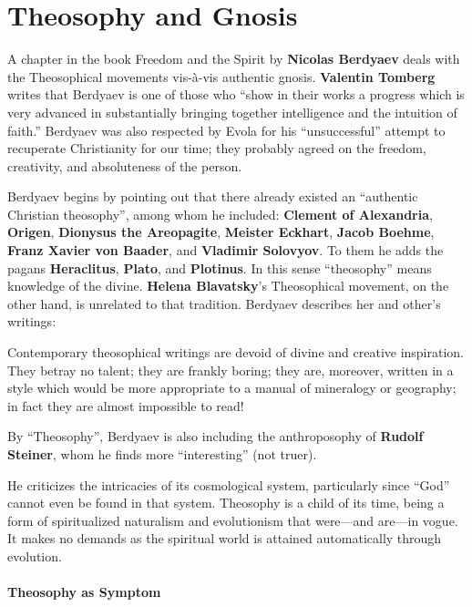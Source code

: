 \section{Theosophy and Gnosis}

A chapter in the book Freedom and the Spirit by \textbf{Nicolas Berdyaev} deals with the Theosophical movements vis-à-vis authentic gnosis. \textbf{Valentin Tomberg} writes that Berdyaev is one of those who ``show in their works a progress which is very advanced in substantially bringing together intelligence and the intuition of faith.'' Berdyaev was also respected by Evola for his ``unsuccessful'' attempt to recuperate Christianity for our time; they probably agreed on the freedom, creativity, and absoluteness of the person.

Berdyaev begins by pointing out that there already existed an ``authentic Christian theosophy'', among whom he included: \textbf{Clement of Alexandria}, \textbf{Origen}, \textbf{Dionysus the Areopagite}, \textbf{Meister Eckhart}, \textbf{Jacob Boehme}, \textbf{Franz Xavier von Baader}, and \textbf{Vladimir Solovyov}. To them he adds the pagans \textbf{Heraclitus}, \textbf{Plato}, and
\textbf{Plotinus}. In this sense ``theosophy'' means knowledge of the divine. \textbf{Helena Blavatsky}'s Theosophical movement, on the other hand, is unrelated to that tradition. Berdyaev describes her and other's writings:

\begin{quotex}
Contemporary theosophical writings are devoid of divine and creative inspiration. They betray no talent; they are frankly boring; they are, moreover, written in a style which would be more appropriate to a manual of mineralogy or geography; in fact they are almost impossible to read!
\end{quotex}


By ``Theosophy'', Berdyaev is also including the anthroposophy of \textbf{Rudolf Steiner}, whom he finds more ``interesting'' (not truer).

He criticizes the intricacies of its cosmological system, particularly since ``God'' cannot even be found in that system. Theosophy is a child of its time, being a form of spiritualized naturalism and evolutionism that were---and are---in vogue. It makes no demands as the spiritual world is attained automatically through evolution.

\paragraph{Theosophy as Symptom}


